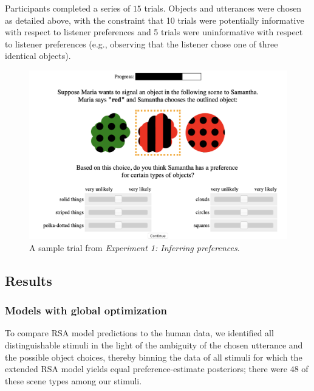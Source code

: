 \documentclass[10pt,a4paper]{article}
\newcommand{\gcs}[1]{\textcolor{blue}{[gcs: #1]}}
\begin{document}
Participants completed a series of $15$ trials. Objects and utterances were chosen as detailed above, with the constraint that 10 trials were potentially informative with respect to listener preferences and 5 trials were uninformative with respect to listener preferences (e.g., observing that the listener chose one of three identical objects). 

\begin{figure}[ht!]
	\centering
	\includegraphics[width=4.5in]{images/preference-trial.png}
	\caption{A sample trial from \emph{Experiment 1: Inferring preferences}.}\label{exp1-trial}
\end{figure}

\subsection{Results}

\subsubsection{Models with global optimization}

To compare RSA model predictions to the human data, we identified all distinguishable stimuli in the light of the ambiguity of the chosen utterance and the possible object choices, thereby binning the data of all stimuli for which the extended RSA model yields equal preference-estimate posteriors; there were $48$ of these scene types among our stimuli.
\end{document}
